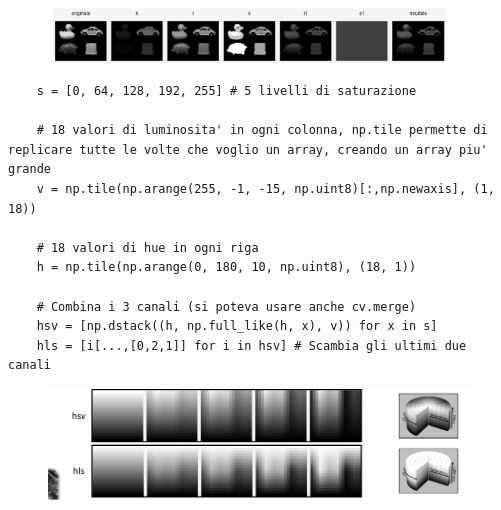 \begin{figure}[htp]
	\includegraphics[width=300pt]{./immagini/opencv_images_c6.png}
	\label{img:opencv_images_c6}
\end{figure}

\begin{lstlisting}
	s = [0, 64, 128, 192, 255] # 5 livelli di saturazione
	
	# 18 valori di luminosita' in ogni colonna, np.tile permette di replicare tutte le volte che voglio un array, creando un array piu' grande
	v = np.tile(np.arange(255, -1, -15, np.uint8)[:,np.newaxis], (1, 18))
	
	# 18 valori di hue in ogni riga
	h = np.tile(np.arange(0, 180, 10, np.uint8), (18, 1))
	
	# Combina i 3 canali (si poteva usare anche cv.merge)
	hsv = [np.dstack((h, np.full_like(h, x), v)) for x in s]
	hls = [i[...,[0,2,1]] for i in hsv] # Scambia gli ultimi due canali
\end{lstlisting}


\begin{figure}[htp]
	\includegraphics[width=\linewidth]{./immagini/opencv_images_c7.png}
	\label{img:opencv_images_c7}
\end{figure}
